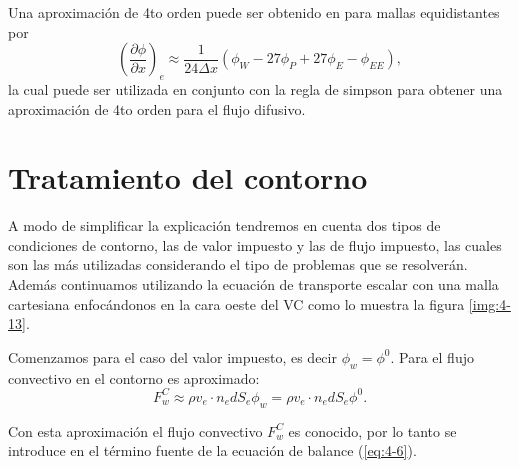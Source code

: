\documentclass[a4paper,10pt, oneside]{book}
\begin{document}
Una aproximación de 4to orden puede ser obtenido en para mallas equidistantes por
\begin{equation}
	\left( \frac{\partial \phi}{\partial x} \right)_e \approx \frac{1}{24 \Delta x} (\phi_W - 27\phi_P + 27\phi_E - \phi_{EE}),
\end{equation}
la cual puede ser utilizada en conjunto con la regla de simpson para obtener una aproximación de 4to orden para el flujo difusivo.

\section{Tratamiento del contorno}

A modo de simplificar la explicación tendremos en cuenta dos tipos de condiciones de contorno, las de valor impuesto y las de flujo impuesto, las cuales son las más utilizadas considerando el tipo de problemas que se resolverán. Además continuamos utilizando la ecuación de transporte escalar con una malla cartesiana enfocándonos en la cara oeste del VC como lo muestra la figura \ref{img:4-13}.

Comenzamos para el caso del valor impuesto, es decir $\phi_w = \phi^0$. Para el flujo convectivo en el contorno es aproximado:
\begin{equation}
	F_w^C \approx \rho v_e \cdot n_e dS_e \phi_w = \rho v_e \cdot n_e dS_e \phi^0.
\end{equation}

Con esta aproximación el flujo convectivo $F_w^C$ es conocido, por lo tanto se introduce en el término fuente de la ecuación de balance (\ref{eq:4-6}). 
\end{document}
